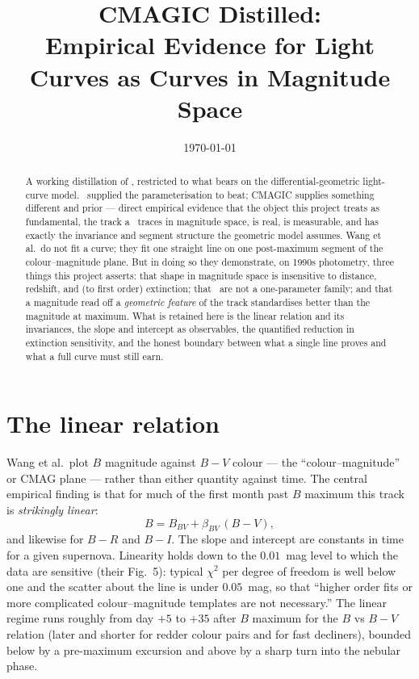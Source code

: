 \documentclass[11pt]{article}
\title{CMAGIC Distilled: \\ Empirical Evidence for Light Curves as Curves in Magnitude Space}
\date{\today}
\begin{document}
\maketitle

\begin{abstract}
A working distillation of \citet{Wang2003}, restricted to what bears on the
differential-geometric light-curve model. \salt\ supplied the parameterisation to
beat; CMAGIC supplies something different and prior --- direct empirical evidence
that the object this project treats as fundamental, the track a \snia\ traces in
magnitude space, is real, is measurable, and has exactly the invariance and
segment structure the geometric model assumes. Wang et al.\ do not fit a curve;
they fit one straight line on one post-maximum segment of the colour--magnitude
plane. But in doing so they demonstrate, on 1990s photometry, three things this
project asserts: that shape in magnitude space is insensitive to distance,
redshift, and (to first order) extinction; that \snia\ are not a one-parameter
family; and that a magnitude read off a \emph{geometric feature} of the track
standardises better than the magnitude at maximum. What is retained here is the
linear relation and its invariances, the slope and intercept as observables, the
quantified reduction in extinction sensitivity, and the honest boundary between
what a single line proves and what a full curve must still earn.
\end{abstract}

\section{The linear relation}

Wang et al.\ plot $B$ magnitude against $B-V$ colour --- the ``colour--magnitude''
or CMAG plane --- rather than either quantity against time. The central empirical
finding is that for much of the first month past $B$ maximum this track is
\emph{strikingly linear}:
\begin{equation}
  B = B_{BV} + \beta_{BV}\,(B-V),
  \label{eq:cmagic}
\end{equation}
and likewise for $B-R$ and $B-I$. The slope and intercept are constants in time for
a given supernova. Linearity holds down to the $0.01$~mag level to which the data
are sensitive (their Fig.~5): typical $\chi^{2}$ per degree of freedom is well below
one and the scatter about the line is under $0.05$~mag, so that ``higher order fits
or more complicated colour--magnitude templates are not necessary.'' The linear
regime runs roughly from day $+5$ to $+35$ after $B$ maximum for the $B$ vs $B-V$
relation (later and shorter for redder colour pairs and for fast decliners), bounded
below by a pre-maximum excursion and above by a sharp turn into the nebular phase.
\end{document}
